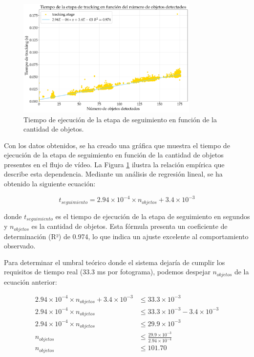 \documentclass[11pt,spanish,listoffigures,listoftables]{tfgetsinf}
\begin{document}
\begin{figure}[H]
   \centering
   \includegraphics[width=0.8\textwidth]{excels/inferencia/cantidad_objetos/resultados/regresion_tracking/regresion_tracking.pdf}
   \caption[Tiempo de ejecución de la etapa de seguimiento en función de la cantidad de objetos]{Tiempo de ejecución de la etapa de seguimiento en función de la cantidad de objetos.}
   \label{fig:tiempo_etapa_tracking_cantidad_objetos}
\end{figure}

Con los datos obtenidos, se ha creado una gráfica que muestra el tiempo de ejecución de la etapa de seguimiento en función de la cantidad de objetos presentes en el flujo de vídeo. La Figura \ref{fig:tiempo_etapa_tracking_cantidad_objetos} ilustra la relación empírica que describe esta dependencia. Mediante un análisis de regresión lineal, se ha obtenido la siguiente ecuación:

\begin{equation}
t_{seguimiento} = 2.94 \times 10^{-4} \times n_{objetos} + 3.4 \times 10^{-3}
\end{equation}

donde $t_{seguimiento}$ es el tiempo de ejecución de la etapa de seguimiento en segundos y $n_{objetos}$ es la cantidad de objetos. Esta fórmula presenta un coeficiente de determinación (R²) de 0.974, lo que indica un ajuste excelente al comportamiento observado.

Para determinar el umbral teórico donde el sistema dejaría de cumplir los requisitos de tiempo real (33.3 ms por fotograma), podemos despejar $n_{objetos}$ de la ecuación anterior:

\begin{align}
   2.94 \times 10^{-4} \times n_{objetos} + 3.4 \times 10^{-3} &\leq 33.3 \times 10^{-3} \\
   2.94 \times 10^{-4} \times n_{objetos} &\leq 33.3 \times 10^{-3} - 3.4 \times 10^{-3} \\
   2.94 \times 10^{-4} \times n_{objetos} &\leq 29.9 \times 10^{-3} \\
   n_{objetos} &\leq \frac{29.9 \times 10^{-3}}{2.94 \times 10^{-4}} \\
   n_{objetos} &\leq 101.70
\end{align}
\end{document}

